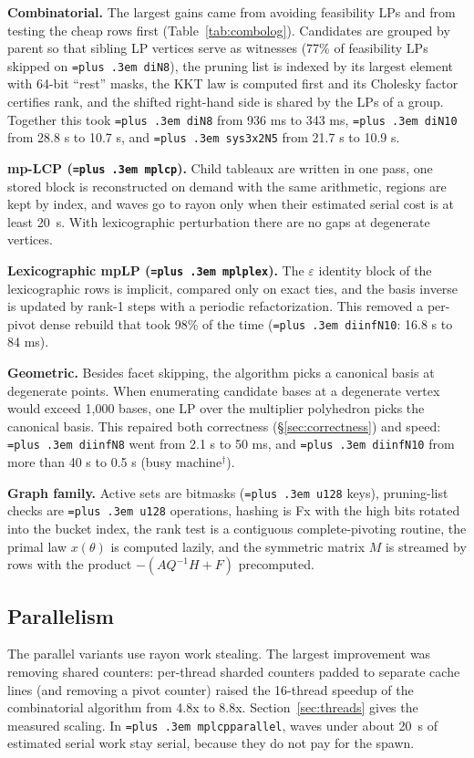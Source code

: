 \documentclass[10pt,a4paper]{article}
\newcommand{\busy}{$^\dagger$}
\newcommand{\code}[1]{{\let\_\bu\texttt{\spaceskip=\fontdimen2\font plus .3em #1}}}
\newcommand{\bu}{\textunderscore\hspace{0pt}}
\begin{document}
\textbf{Combinatorial.} The largest gains came from avoiding feasibility LPs and from testing the cheap rows first
(Table~\ref{tab:combolog}). Candidates are grouped by parent so that sibling LP vertices serve as witnesses (77\% of feasibility
LPs skipped on \code{di\_N8}), the pruning list is indexed by its largest element with 64-bit ``rest'' masks, the KKT law is computed
first and its Cholesky factor certifies rank, and the shifted right-hand side is shared by the LPs of a group. Together this took
\code{di\_N8} from 936 ms to 343 ms, \code{di\_N10} from 28.8 s to 10.7 s, and \code{sys3x2\_N5} from 21.7 s to 10.9 s.

\textbf{mp-LCP (\code{mplcp}).} Child tableaux are written in one pass, one stored block is reconstructed on demand with the same
arithmetic, regions are kept by index, and waves go to rayon only when their estimated serial cost is at least 20~\textmu s. With
lexicographic perturbation there are no gaps at degenerate vertices.

\textbf{Lexicographic mpLP (\code{mplp\_lex}).} The $\varepsilon$ identity block of the lexicographic rows is implicit, compared only
on exact ties, and the basis inverse is updated by rank-1 steps with a periodic refactorization. This removed a per-pivot dense
rebuild that took 98\% of the time (\code{diinf\_N10}: 16.8 s to 84 ms).

\textbf{Geometric.} Besides facet skipping, the algorithm picks a canonical basis at degenerate points. When enumerating candidate
bases at a degenerate vertex would exceed 1,000 bases, one LP over the multiplier polyhedron picks the canonical basis. This
repaired both correctness (\S\ref{sec:correctness}) and speed: \code{diinf\_N8} went from 2.1 s to 50 ms, and \code{diinf\_N10}
from more than 40 s to 0.5 s (busy machine\busy{}).

\textbf{Graph family.} Active sets are bitmasks (\code{u128} keys), pruning-list checks are \code{u128} operations, hashing is Fx with the
high bits rotated into the bucket index, the rank test is a contiguous complete-pivoting routine, the primal law $x(\theta)$ is computed
lazily, and the symmetric matrix $M$ is streamed by rows with the product $-(AQ^{-1}H+F)$ precomputed.

\subsection{Parallelism}

The parallel variants use rayon work stealing. The largest improvement was removing shared counters: per-thread sharded counters
padded to separate cache lines (and removing a pivot counter) raised the 16-thread speedup of the combinatorial algorithm from
4.8x to 8.8x. Section~\ref{sec:threads} gives the measured scaling. In \code{mplcp\_parallel}, waves under about
20~\textmu s of estimated serial work stay serial, because they do not pay for the spawn.
\end{document}
